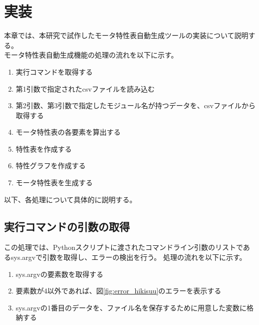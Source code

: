 
\chapter{実装}\label{cha:Implementation}
本章では、本研究で試作したモータ特性表自動生成ツールの実装について説明する。\\
モータ特性表自動生成機能の処理の流れを以下に示す。
\begin{enumerate}
    \item 実行コマンドを取得する
    \item 第1引数で指定されたcsvファイルを読み込む
    \item 第2引数、第3引数で指定したモジュール名が持つデータを、csvファイルから取得する
    \item モータ特性表の各要素を算出する
    \item 特性表を作成する
    \item 特性グラフを作成する
    \item モータ特性表を生成する
\end{enumerate}

以下、各処理について具体的に説明する。

\section{実行コマンドの引数の取得}\label{comandget}
この処理では、Pythonスクリプトに渡されたコマンドライン引数のリストであるsys.argvで引数を取得し、エラーの検出を行う。
処理の流れを以下に示す。
\begin{enumerate}
    \item sys.argvの要素数を取得する
    \item 要素数が4以外であれば、図\ref{fig:error_hikisuu}のエラーを表示する
    \item sys.argvの1番目のデータを、ファイル名を保存するために用意した変数に格納する
\end{enumerate}

